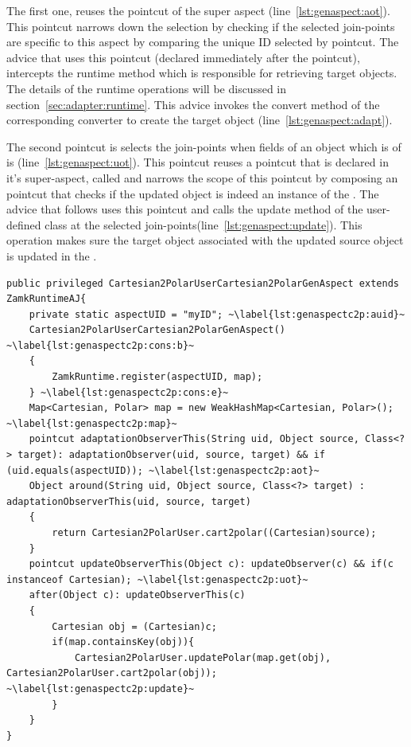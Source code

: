 The first one, reuses the  pointcut of the super aspect  (line~\ref{lst:genaspect:aot}). This pointcut narrows down the selection by checking if the selected join-points are specific to this aspect by comparing the unique ID selected by  pointcut. 
The  advice that uses this pointcut (declared immediately after the pointcut), intercepts the runtime method which is responsible for retrieving target objects. The details of the runtime operations will be discussed in section~\ref{sec:adapter:runtime}. This advice invokes the convert method of the corresponding converter to create the target object (line~\ref{lst:genaspect:adapt}). 

The second pointcut  is selects the join-points when fields of an object which is of  is  (line~\ref{lst:genaspect:uot}). This pointcut reuses a pointcut that is  declared in it's super-aspect, called  and narrows the scope of this pointcut by composing an  pointcut that checks if the updated object is indeed an instance of the . The  advice that follows uses this pointcut and calls the update method of the user-defined class at the selected join-points(line~\ref{lst:genaspect:update}). 
This operation makes sure the target object associated with the updated source object is updated in the . 

\begin{lstlisting}[float, caption={The aspect generated for the Cartesian to Polar converter in listing~\ref{lst:c2pconverter}}, label={lst:c2pconvertergenaspect}]
public privileged Cartesian2PolarUserCartesian2PolarGenAspect extends ZamkRuntimeAJ{
	private static aspectUID = "myID"; ~\label{lst:genaspectc2p:auid}~
	Cartesian2PolarUserCartesian2PolarGenAspect() ~\label{lst:genaspectc2p:cons:b}~
	{
		ZamkRuntime.register(aspectUID, map);
	} ~\label{lst:genaspectc2p:cons:e}~
	Map<Cartesian, Polar> map = new WeakHashMap<Cartesian, Polar>(); ~\label{lst:genaspectc2p:map}~
	pointcut adaptationObserverThis(String uid, Object source, Class<?> target): adaptationObserver(uid, source, target) && if (uid.equals(aspectUID)); ~\label{lst:genaspectc2p:aot}~
	Object around(String uid, Object source, Class<?> target) : adaptationObserverThis(uid, source, target)
	{
		return Cartesian2PolarUser.cart2polar((Cartesian)source);
	}
	pointcut updateObserverThis(Object c): updateObserver(c) && if(c instanceof Cartesian); ~\label{lst:genaspectc2p:uot}~
	after(Object c): updateObserverThis(c)
	{
		Cartesian obj = (Cartesian)c;
		if(map.containsKey(obj)){
			Cartesian2PolarUser.updatePolar(map.get(obj), Cartesian2PolarUser.cart2polar(obj)); ~\label{lst:genaspectc2p:update}~
		}	
	}
}
\end{lstlisting}

